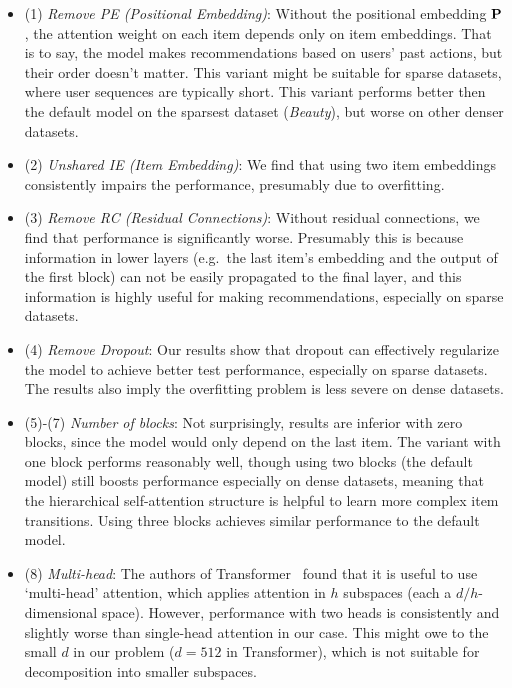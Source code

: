 \documentclass[conference]{IEEEtran}
\def\P{{\bf P}}
\begin{document}
\begin{itemize}
\item (1) \emph{Remove PE (Positional Embedding)}: Without the positional embedding $\P$, the attention weight on each item 
depends only on item embeddings.
That is to say, the model makes recommendations 
based on users' past actions,
but
their order doesn't matter.
This
variant might be suitable for sparse datasets, where user sequences are typically short. This variant performs better then the default model on the sparsest dataset (\emph{Beauty}), but worse on other denser datasets.
\item (2) \emph{Unshared IE (Item Embedding)}: We 
find
that using two item embeddings consistently impairs the performance,
presumably due to overfitting.

\item (3) \emph{Remove RC (Residual Connections)}: 
Without residual connections, we find that performance is significantly worse. Presumably this is because
information in lower layers (e.g.~the last item's embedding and the output of the first block) can not be easily propagated to the final layer, and this information is highly useful for making recommendations, especially on sparse datasets.

\item (4) \emph{Remove Dropout}: Our results show that
dropout can effectively regularize the model to achieve better test performance, especially on sparse datasets. The results also imply the overfitting problem is less severe on dense datasets.

\item (5)-(7) \emph{Number of blocks}:
Not surprisingly, results are inferior
with
zero blocks, since the model would only depend on the last 
item. The variant with one block performs reasonably well, though using two blocks (the default model) still boosts performance especially on dense datasets, meaning that the hierarchical self-attention structure is helpful to learn more complex item transitions. Using three blocks achieves similar performance to the default model.

\item (8) \emph{Multi-head}: 
The authors
of Transformer~\cite{transform} found that it is useful to use `multi-head' attention, which 
applies
attention in $h$ subspaces (each a $d/h$-dimensional space). However,
performance with two heads is consistently and slightly worse than single-head attention in our case. 
This might owe
to the small $d$ in our problem ($d=512$ in Transformer), which is not suitable for decomposition into smaller subspaces.



\end{itemize}
\end{document}
